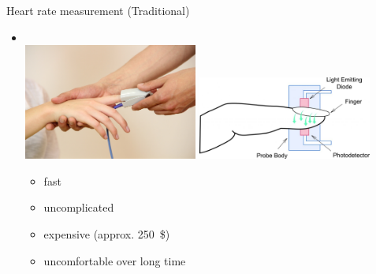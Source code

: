 \documentclass{beamer}
\begin{document}
\begin{frame}{Heart rate measurement (Traditional)}
	\begin{itemize}
		\item {}\\
			\vspace{0.2cm}
			\includegraphics[width=0.45\textwidth, height=0.3\paperheight]{bvp_sensor_mirrored.jpg}
			\hfill
			\includegraphics[width=0.45\textwidth, height=0.3\paperheight]{pulse_oximetry_sketch.jpg}\\ \pause
		\noindent
		\begin{minipage}[t]{0.45\textwidth}
			\begin{itemize}[label=\positiveaspect]
				\item fast \pause
				\item uncomplicated \pause
			\end{itemize}
		\end{minipage}
		\hfill\vline\hfill
		\begin{minipage}[t]{0.45\textwidth}
			\begin{itemize}[label=\negativeaspect]
				\item expensive (approx. 250~\$) \pause
				\item uncomfortable over long time
			\end{itemize}
		\end{minipage}
	\end{itemize}
\end{frame}
\end{document}

